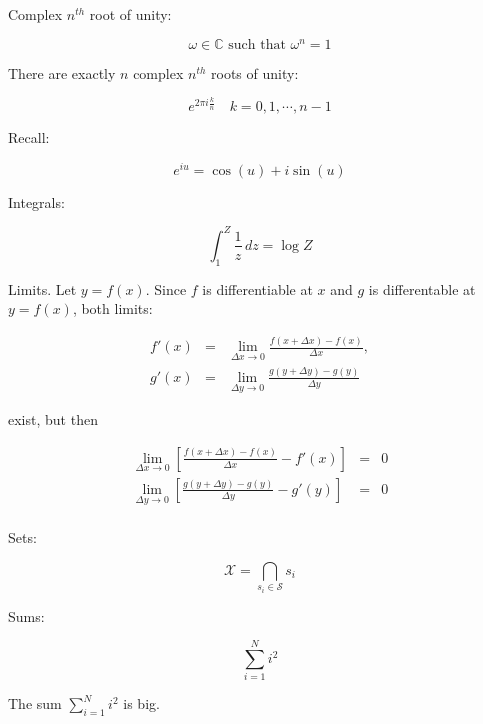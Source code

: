 \documentclass{article}
\begin{document}
\noindent Complex $n^{th}$ root of unity:

\[ \omega \in \mathbb{C} \mbox{ such that } \omega^n = 1 \]

\noindent There are exactly $n$ complex $n^{th}$ roots of unity:

\[ e^{2 \pi i \frac{k}{n}} \quad k=0,1, \cdots, n-1 \] 

\noindent Recall:

\[ e^{i u} = \cos(u) + i \sin(u) \]

\newpage

\noindent Integrals:

\begin{equation}
\int_1^{Z} \frac{1}{z} \, dz = \log Z
\end{equation}

\noindent Limits.  Let $y = f(x)$.  Since $f$ is differentiable
at $x$ and $g$ is differentable at $y = f(x)$, both limits:

\begin{eqnarray*}
f'(x) & = & \lim_{\Delta x \to 0} \frac{f(x + \Delta x) - f(x)}{\Delta x}, \\
g'(x) & = & \lim_{\Delta y \to 0} \frac{g(y + \Delta y) - g(y)}{\Delta y}
\end{eqnarray*}

\noindent exist, but then

\begin{eqnarray*}
\lim_{\Delta x \to 0} \left[ \frac{f(x + \Delta x) - f(x)}{\Delta x} - f'(x) \right] & = & 0 \\
\lim_{\Delta y \to 0} \left[ \frac{g(y + \Delta y) - g(y)}{\Delta y} - g'(y) \right] & = & 0 \\
\end{eqnarray*}

\newpage

\noindent Sets:

\[ \mathcal{X} = \bigcap_{s_i \in \mathcal{S}} s_i \]

\noindent Sums:

\[ \sum_{i=1}^{N} i^2 \]

\noindent The sum $\sum_{i=1}^{N} i^2$ is big.
\end{document}
